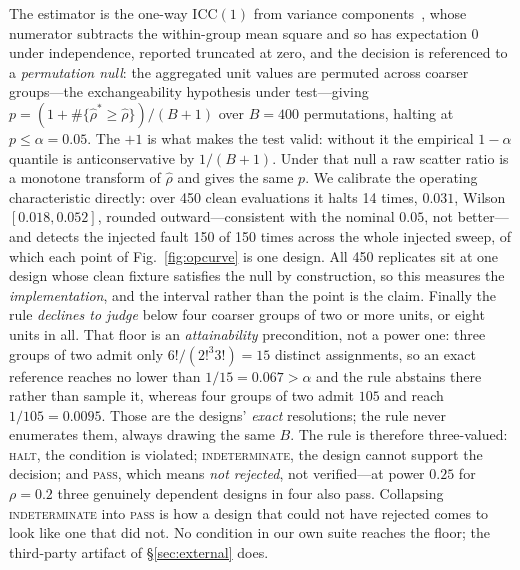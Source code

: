 \documentclass[conference]{IEEEtran}
\newcommand{\artv}[2]{#2}
\begin{document}
The estimator is the one-way $\mathrm{ICC}(1)$ from variance
components~\cite{shrout1979icc}, whose numerator subtracts the within-group mean square and so has
expectation $0$ under independence, reported truncated at zero, and the
decision is referenced to a \emph{permutation null}: the aggregated unit values are permuted across
coarser groups---the exchangeability hypothesis under test---giving
$p=(1+\#\{\hat{\rho}^{*}\ge\hat{\rho}\})/(B+1)$ over $B=\num{400}$ permutations, halting at
$p\le\alpha=0.05$. The $+1$ is what makes the test valid: without it the empirical $1-\alpha$
quantile is anticonservative by $1/(B+1)$. Under that null a raw scatter ratio is a monotone
transform of $\hat{\rho}$ and gives the same $p$. We calibrate the operating characteristic
directly: over
\artv{l47_clean_paths}{\num{450}} clean evaluations it halts \artv{l47_false_halts}{\num{14}}
times, $\artv{l47_rate}{0.031}$, Wilson~\cite{wilson1927}
$\artv{l47_wilson}{[0.018,0.052]}$, rounded outward---consistent with the nominal $\artv{l47_alpha}{0.05}$, not
better---and detects the injected fault \artv{l47_injected}{\num{150}} of \artv{l47_injected}{\num{150}} times across the whole injected sweep, of which each point of
Fig.~\ref{fig:opcurve} is one design. All \artv{l47_clean_paths}{\num{450}} replicates sit
at one design whose clean fixture satisfies the null by construction, so this measures the
\emph{implementation}, and the interval rather than the point is the claim. Finally the rule \emph{declines to judge} below four coarser groups of two or more units, or
eight units in all. That floor is an \emph{attainability} precondition, not a power one: three groups of two
admit only $6!/(2!^{3}3!)=15$ distinct assignments, so an exact reference reaches no lower than
$1/15=0.067>\alpha$ and the rule abstains there rather than sample it, whereas four groups of two
admit $105$ and reach $1/105=0.0095$. Those are the designs' \emph{exact} resolutions; the rule never
enumerates them, always drawing the same $B$. The rule is therefore three-valued:
\textsc{halt}, the condition is violated; \textsc{indeterminate}, the design cannot support the
decision; and \textsc{pass}, which means \emph{not rejected}, not verified---at power $\artv{l47_power_02}{0.25}$ for
$\rho=0.2$ three genuinely dependent designs in four also pass. Collapsing \textsc{indeterminate}
into \textsc{pass} is how a design that could not have rejected comes to look like one that did not. No condition in our own suite reaches
the floor; the third-party artifact of \S\ref{sec:external} does.
\end{document}

